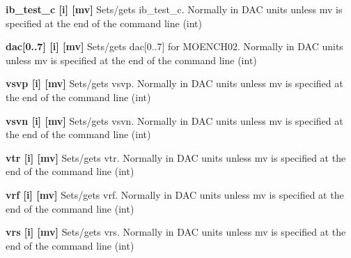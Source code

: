 \begin{DoxyItemize}
\item {\bfseries ib\_\-test\_\-c \mbox{[}i\mbox{]} \mbox{[}mv\mbox{]}} Sets/gets ib\_\-test\_\-c. Normally in DAC units unless {\ttfamily mv} is specified at the end of the command line (int)
\end{DoxyItemize}


\begin{DoxyItemize}
\item {\bfseries dac\mbox{[}0..7\mbox{]} \mbox{[}i\mbox{]} \mbox{[}mv\mbox{]}} Sets/gets dac\mbox{[}0..7\mbox{]} for MOENCH02. Normally in DAC units unless {\ttfamily mv} is specified at the end of the command line (int)
\end{DoxyItemize}


\begin{DoxyItemize}
\item {\bfseries vsvp \mbox{[}i\mbox{]} \mbox{[}mv\mbox{]}} Sets/gets vsvp. Normally in DAC units unless {\ttfamily mv} is specified at the end of the command line (int)
\end{DoxyItemize}


\begin{DoxyItemize}
\item {\bfseries vsvn \mbox{[}i\mbox{]} \mbox{[}mv\mbox{]}} Sets/gets vsvn. Normally in DAC units unless {\ttfamily mv} is specified at the end of the command line (int)
\end{DoxyItemize}


\begin{DoxyItemize}
\item {\bfseries vtr \mbox{[}i\mbox{]} \mbox{[}mv\mbox{]}} Sets/gets vtr. Normally in DAC units unless {\ttfamily mv} is specified at the end of the command line (int)
\end{DoxyItemize}


\begin{DoxyItemize}
\item {\bfseries vrf \mbox{[}i\mbox{]} \mbox{[}mv\mbox{]}} Sets/gets vrf. Normally in DAC units unless {\ttfamily mv} is specified at the end of the command line (int)
\end{DoxyItemize}


\begin{DoxyItemize}
\item {\bfseries vrs \mbox{[}i\mbox{]} \mbox{[}mv\mbox{]}} Sets/gets vrs. Normally in DAC units unless {\ttfamily mv} is specified at the end of the command line (int)
\end{DoxyItemize}



